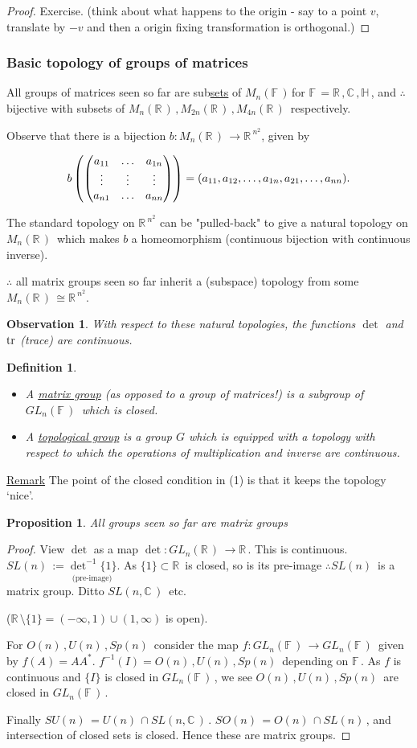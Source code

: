 \documentclass[12pt,a4paper]{article}
\newcommand{\rR}{\ensuremath{\mathbb{R}\,}}
\newcommand{\cC}{\ensuremath{\mathbb{C}\,}}
\newcommand{\hH}{\ensuremath{\mathbb{H}\,}}
\newcommand{\fF}{\ensuremath{\mathbb{F}\,}}
\newcommand{\mnr}{\ensuremath{M_n(\rR)\,}}
\newcommand{\mnf}{\ensuremath{M_n(\fF)\,}}
\newcommand{\mr}[1]{\ensuremath{M_{#1}(\rR)\,}}
\newcommand{\glnr}{\ensuremath{GL_n(\rR)\,}}
\newcommand{\glnff}{\ensuremath{GL_n(\fF)\,}}
\newcommand{\gon}{\ensuremath{O(n)\,}}
\newcommand{\gun}{\ensuremath{U(n)\,}}
\newcommand{\gspn}{\ensuremath{Sp(n)\,}}
\newcommand{\gson}{\ensuremath{SO(n)\,}}
\newcommand{\gsun}{\ensuremath{SU(n)\,}}
\newcommand{\gsln}{\ensuremath{SL(n)\,}}
\newcommand{\gslk}[1]{\ensuremath{SL(#1)\,}}
\newcommand{\ul}[1]{\underline{#1}}
\newcommand{\genericA}{\ensuremath{\pmqty{a_{11} & \ldots & a_{1n} \\ \vdots & \vdots & \vdots \\ a_{n1} & \ldots & a_{nn}}}}
\newtheorem{defn}[thm]{Definition}
\newtheorem{prop}[thm]{Proposition}
\newtheorem{obs}[thm]{Observation}
\begin{document}
\begin{proof}
Exercise. (think about what happens to the origin - say to a point $v$, translate by $-v$ and then a origin fixing transformation is orthogonal.)
\end{proof}

\subsubsection{Basic topology of groups of matrices}
All groups of matrices seen so far are sub\ul{sets} of \mnf for $\fF=\rR,\cC,\hH$, and $\therefore$ bijective with subsets of $\mnr, \mr{2n}, \mr{4n}$ respectively.

Observe that there is a bijection $b:\mnr \to \rR^{n^2}$, given by 

\[b\left(\genericA \right)=(a_{11},a_{12},\ldots,a_{1n},a_{21},\ldots,a_{nn}).\]

The standard topology on $\rR^{n^2}$ can be "pulled-back" to give a natural topology on $\mnr$ which makes $b$ a homeomorphism (continuous bijection with continuous inverse). 

$\therefore$ all matrix groups seen so far inherit a (subspace) topology from some $\mnr \cong \rR^{n^2}$.

\begin{obs}
With respect to these natural topologies, the functions $\det$ and $\tr$ (trace) are continuous.
\end{obs}

\begin{defn}
\phantom{a}
\begin{itemize}
\item[1)] A \ul{matrix group} (as opposed to a group of matrices!) is a subgroup of $\glnff$ which is closed.
\item[2)] A \ul{topological group} is a group $G$ which is equipped with a topology with respect to which the operations of multiplication and inverse are continuous.
\end{itemize}
\end{defn}

\ul{Remark} The point of the closed condition in (1) is that it keeps the topology `nice'.

\begin{prop}
All groups seen so far are matrix groups
\end{prop}
\begin{proof}
View $\det$ as a map $\det:\glnr \to \rR$. This is continuous. $\gsln := \underset{\text{(pre-image)}}{\det ^{-1}\{1\}}$. As $\{1\}\subset \rR$ is closed, so is its pre-image $\therefore \gsln$ is a matrix group. Ditto $\gslk{n,\cC}$ etc.

($\rR \setminus \{1\}=(-\infty,1)\cup(1,\infty)$ is open).

For $\gon, \gun, \gspn$ consider the map $f:\glnff\to\glnff$ given by $f(A)=AA^*$. $f^{-1}(I)=\gon, \gun, \gspn$ depending on $\fF$. As $f$ is continuous and $\{I\}$ is closed in $\glnff$, we see $\gon, \gun, \gspn$ are closed in $\glnff$.

Finally $\gsun=\gun \cap \gslk{n,\cC}$. $\gson=\gon \cap \gsln$, and intersection of closed sets is closed. Hence these are matrix groups. 
\end{proof}
\end{document}

